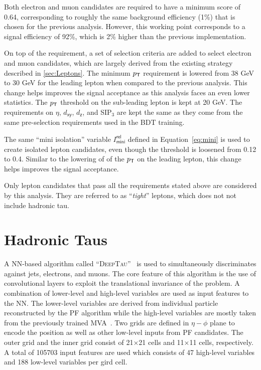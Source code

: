 Both electron and muon candidates are required to have a minimum \TOP score of 0.64, corresponding to roughly the same background efficiency (1\%) that is chosen for the previous analysis. However, this working point corresponds to a signal efficiency of 92\%, which is 2\% higher than the previous implementation.

On top of the \TOP requirement, a set of selection criteria are added to select electron and muon candidates, which are largely derived from the existing strategy described in \autoref{sec:Leptons}. The minimum $p_{\textsf{T}}$ requirement is lowered from 38 GeV to 30 GeV for the leading lepton when compared to the previous analysis. This change helps improves the signal acceptance as this analysis faces an even lower statistics. The $p_{\textsf{T}}$ threshold on the sub-leading lepton is kept at 20 GeV. The requirements on $\eta$, $d_{\textsf{xy}}$, $d_{\textsf{z}}$, and SIP$_3$ are kept the same as they come from the same pre-selection requirements used in the \ac{BDT} training. 

The same ``mini isolation'' variable $I^{\textsf{rel}}_{\textsf{mini}}$ defined in Equation~\ref{eq:mini} is used to create isolated lepton candidates, even though the threshold is loosened from 0.12 to 0.4. Similar to the lowering of of the $p_{\textsf{T}}$ on the leading lepton, this change helps improves the signal acceptance.

Only lepton candidates that pass all the requirements stated above are considered by this analysis. They are referred to as ``\emph{tight}'' leptons, which does not not include hadronic tau.

\section{Hadronic Taus}
\label{sec:Taus}

A \ac{NN}-based algorithm called ``\textsc{DeepTau}''~\cite{CMS:2022prd} is used to simultaneously discriminates
against jets, electrons, and muons. The core feature of this algorithm is the use of convolutional layers to exploit the translational invariance of the problem. A combination of lower-level and high-level variables are used as input features to the \ac{NN}. The lower-level variables are derived from individual particle reconstructed by the \ac{PF} algorithm while the high-level variables are mostly taken from the previously trained \ac{MVA}~\cite{CMS:2015pac}. Two grids are defined in $\eta-\phi$ plane to encode the position as well as other low-level inputs from \ac{PF} candidates. The outer grid and the inner grid consist of 21$\times$21 cells and 11$\times$11 cells, respectively. A total of 105703 input features are used which consists of 47 high-level variables and 188 low-level variables per gird cell.


